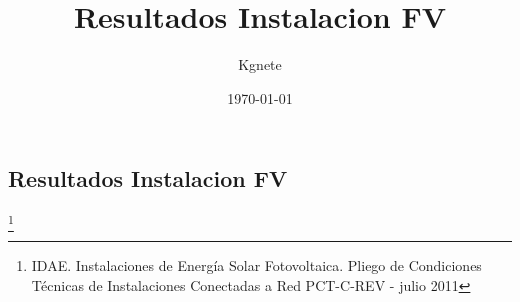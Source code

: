 \documentclass{article}
\title{Resultados Instalacion FV}
\author{Kgnete}
\date{\today}
\newcommand{\path}{../../assets/settings}
\begin{document}
\maketitle

\subsection{Resultados Instalacion FV    }
\footnote{    IDAE. 
Instalaciones de
Energía Solar Fotovoltaica.
Pliego de Condiciones Técnicas de
Instalaciones Conectadas a Red
PCT-C-REV - julio 2011}

\ifdefined{} %
\else


\fi
\end{document}
